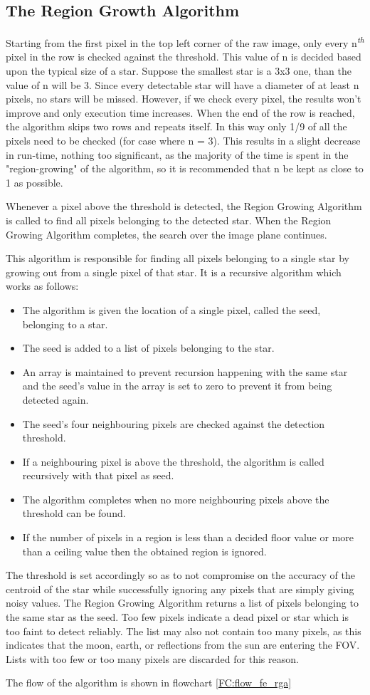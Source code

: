 \documentclass[../../main.tex]{subfiles}
\begin{document}
\subsection{The Region Growth Algorithm}
Starting from the first pixel in the top left corner of the raw image, only every n\textsuperscript{\textit{th}} pixel in the row is checked against the threshold. This value of n is decided based upon the typical size of a star. Suppose the smallest star is a 3x3 one, than the value of n will be 3. Since every detectable star will have a diameter of at least n pixels, no stars will be missed. However, if we check every pixel, the results won't improve and only execution time increases. When the end of the row is reached, the algorithm skips two rows and repeats itself. In this way only 1/9 of all the pixels need to be checked (for case where n = 3). This results in a slight decrease in run-time, nothing too significant, as the majority of the time is spent in the "region-growing" of the algorithm, so it is recommended that n be kept as close to 1 as possible.

Whenever a pixel above the threshold is detected, the Region Growing Algorithm is called to find all pixels belonging to the detected star. When the Region Growing Algorithm completes, the search over the image plane continues.

This algorithm is responsible for finding all pixels belonging to a single star by growing out from a single pixel of that star. It is a recursive algorithm which works as follows:
\begin{itemize}
    \item The algorithm is given the location of a single pixel, called the seed, belonging to a star.
    \item The seed is added to a list of pixels belonging to the star.
    \item An array is maintained to prevent recursion happening with the same star and the seed's value in the array is set to zero to prevent it from being detected again.
    \item The seed's four neighbouring pixels are checked against the detection threshold.
    \item If a neighbouring pixel is above the threshold, the algorithm is called recursively with that pixel as seed.
    \item The algorithm completes when no more neighbouring pixels above the threshold can be found.
    \item If the number of pixels in a region is less than a decided floor value or more than a ceiling value then the obtained region is ignored.
\end{itemize}
The threshold is set accordingly so as to not compromise on the accuracy of the centroid of the star while successfully ignoring any pixels that are simply giving noisy values. The Region Growing Algorithm returns a list of pixels belonging to the same star as the seed. Too few pixels indicate a dead pixel or star which is too faint to detect reliably. The list may also not contain too many pixels, as this indicates that the moon, earth, or reflections from the sun are entering the FOV. Lists with too few or too many pixels are discarded for this reason.

The flow of the algorithm is shown in flowchart \ref{FC:flow_fe_rga}
\end{document}
